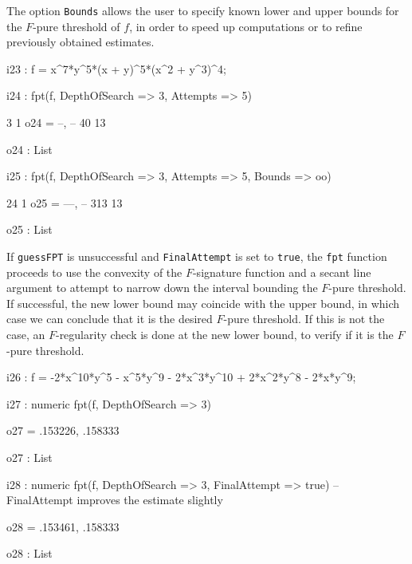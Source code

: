 \documentclass{amsart}
\begin{document}
The option {\tt Bounds} allows the user to specify known lower and upper bounds for the $F$-pure threshold of $f$, in order to speed up computations or to refine previously obtained estimates.  

{\small
{}
\begin{MyVerbatim}

i23 : f = x^7*y^5*(x + y)^5*(x^2 + y^3)^4;

i24 : fpt(f, DepthOfSearch => 3, Attempts => 5)


        3   1
o24 = {--, --}
       40  13

o24 : List

i25 : fpt(f, DepthOfSearch => 3, Attempts => 5, Bounds => oo)

        24   1
o25 = {---, --}
       313  13

o25 : List
\end{MyVerbatim}
}
\medspace


If {\tt guessFPT} is unsuccessful and {\tt FinalAttempt} is set to {\tt true}, the {\tt fpt} function proceeds to use the convexity of the $F$-signature function and a secant line argument to attempt to narrow down the interval bounding the $F$-pure threshold.
If successful, the new lower bound may coincide with the upper bound, in which case we can conclude that it is the desired $F$-pure threshold.
If this is not the case, an $F$-regularity check is done at the new lower bound, to verify if it is the $F$-pure threshold.

{\small
{}
\begin{MyVerbatim}

i26 : f = -2*x^10*y^5 - x^5*y^9 - 2*x^3*y^10 + 2*x^2*y^8 - 2*x*y^9;

i27 : numeric fpt(f, DepthOfSearch => 3)

o27 = {.153226, .158333}

o27 : List

i28 : numeric fpt(f, DepthOfSearch => 3, FinalAttempt => true)
      -- FinalAttempt improves the estimate slightly

o28 = {.153461, .158333}

o28 : List
\end{MyVerbatim}
}
\medspace
  
            
\end{document}
